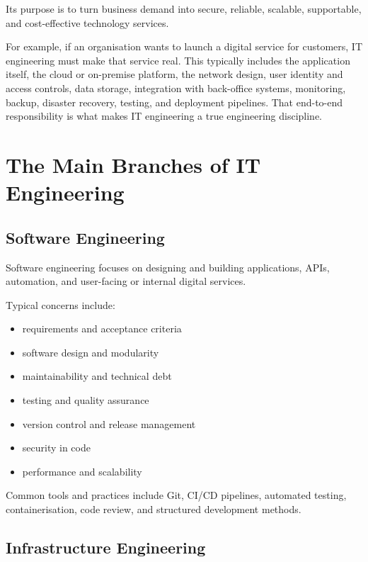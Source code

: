 \documentclass[
  british,
  letterpaper,
  DIV=11,
  numbers=noendperiod]{scrartcl}
\providecommand{\tightlist}{%
  \setlength{\itemsep}{0pt}\setlength{\parskip}{0pt}}
\begin{document}
Its purpose is to turn business demand into secure, reliable, scalable,
supportable, and cost-effective technology services.

For example, if an organisation wants to launch a digital service for
customers, IT engineering must make that service real. This typically
includes the application itself, the cloud or on-premise platform, the
network design, user identity and access controls, data storage,
integration with back-office systems, monitoring, backup, disaster
recovery, testing, and deployment pipelines. That end-to-end
responsibility is what makes IT engineering a true engineering
discipline.

\section{The Main Branches of IT
Engineering}\label{the-main-branches-of-it-engineering}

\subsection{Software Engineering}\label{software-engineering}

Software engineering focuses on designing and building applications,
APIs, automation, and user-facing or internal digital services.

Typical concerns include:

\begin{itemize}
\tightlist
\item
  requirements and acceptance criteria
\item
  software design and modularity
\item
  maintainability and technical debt
\item
  testing and quality assurance
\item
  version control and release management
\item
  security in code
\item
  performance and scalability
\end{itemize}

Common tools and practices include Git, CI/CD pipelines, automated
testing, containerisation, code review, and structured development
methods.

\subsection{Infrastructure
Engineering}\label{infrastructure-engineering}
\end{document}
